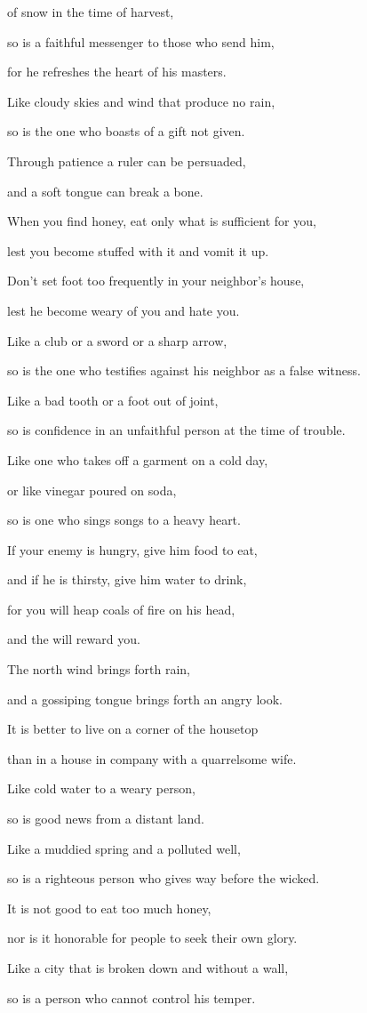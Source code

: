 {of snow
in the time
of harvest,
\par }{\Q so is a faithful
messenger
to those who send
him,
\par }{\Q for he refreshes
the heart
of his masters.
\par }{\Q {}Like cloudy skies and wind
that produce no
rain,
\par }{\Q so is
the one
who boasts of a gift
not given.
\par }{\Q {}Through patience
a ruler
can be persuaded,
\par }{\Q and a soft
tongue
can break
a bone.
\par }{\Q {}When you find
honey,
eat
only what is sufficient for
you,
\par }{\Q lest
you become stuffed
with it and vomit it up.
\par }{\Q {}Don’t set foot
too frequently
in your neighbor’s
house,
\par }{\Q lest
he become weary
of you and hate you.
\par }{\Q {}Like a club
or a sword
or a sharp
arrow,
\par }{\Q so is the one
who testifies
against his neighbor
as a false
witness.
\par }{\Q {}Like a bad
tooth
or a foot
out of joint,
\par }{\Q so is confidence
in an unfaithful person
at the time
of trouble.
\par }{\Q {}Like one who takes
off a garment
on a cold
day,
\par }{\Q or like vinegar
poured on
soda,
\par }{\Q so is one who sings
songs
to a heavy heart.
\par }{\Q {}If
your enemy is hungry,
give him
food
to eat,
\par }{\Q and if
he is thirsty,
give him water
to drink,
\par }{\Q {}for
you
will heap
coals
of fire on
his head,
\par }{\Q and the
{}
will reward you.
\par }{\Q {}The north
wind
brings forth
rain,
\par }{\Q and a gossiping
tongue
brings forth an angry look.
\par }{\Q {}It is better
to live
on
a corner
of the housetop
\par }{\Q than in a house
in company
with a quarrelsome
wife.
\par }{\Q {}Like cold
water
to a weary
person,
\par }{\Q so is good
news
from a distant
land.
\par }{\Q {}Like a muddied
spring
and a polluted
well,
\par }{\Q so is a righteous
person who gives
way before
the wicked.
\par }{\Q {}It is not
good
to eat
too much
honey,
\par }{\Q nor is it honorable for people to seek
their own glory.
\par }{\Q {}Like a city
that is broken down
and without
a wall,
\par }{\Q so is a person
who
cannot
control
his temper.

}
